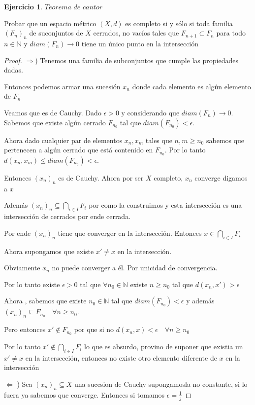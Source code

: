 \documentclass[11pt]{report}
\newcommand{\N}{\mathbb{N}}
\newcommand{\Ra}{\Rightarrow}
\newcommand{\ra}{\rightarrow}
\theoremstyle{definition}
\newtheorem{ej}{Ejercicio}
\begin{document}
	\begin{ej}
	$Teorema$ $de$ $cantor$

	Probar que un espacio métrico $(X,d)$ es completo si y sólo si toda familia $(F_n)_n$ de suconjuntos de $X$ cerrados, no vacíos tales que $F_{n+1} \subset F_n$ para todo $n \in \N$ y $diam(F_n) \ra 0$ tiene un único punto en la intersección

		\begin{proof}
			$\Ra$) Tenemos una familia de subconjuntos que cumple las propiedades dadas.

			Entonces podemos armar una sucesión $x_n$ donde cada elemento es algún elemento de $F_n$

			Veamos que es de Cauchy. Dado $\epsilon >0$ y considerando que $diam(F_n) \ra 0$. Sabemos que existe algún cerrado $F_{n_0}$ tal que $diam(F_{n_0}) < \epsilon$.

			Ahora dado cualquier par de elementos $x_n, x_m$ tales que $n,m \geq n_0$ sabemos que pertenecen a algún cerrado que está contenido en $F_{n_0}$. Por lo tanto $d(x_n,x_m) \leq diam(F_{n_0}) < \epsilon$.

			Entonces $(x_n)_n$ es de Cauchy. Ahora por ser $X$ completo, $x_n$ converge digamos a $x$

			Además $(x_n)_n \subseteq \bigcap_{i \in I} F_i$ por como la construimos y esta intersección es una intersección de cerrados por ende cerrada.

			Por ende $(x_n)_n$ tiene que converger en la intersección. Entonces $x \in \bigcap_{i \in I}F_i$

			Ahora supongamos que existe $x'\neq x$ en la intersección. 

			Obviamente $x_n$ no puede converger a él. Por unicidad de convergencia. 

			Por lo tanto existe $\epsilon > 0$ tal que $\forall n_0\in \N$ existe $n \geq n_0$ tal que $d(x_n,x') > \epsilon$

			Ahora , sabemos que existe $n_0 \in \N$ tal que $diam(F_{n_0}) < \epsilon$ y además  $(x_n)_n \subseteq F_{n_0} \quad \forall n \geq n_0$.

			Pero entonces $x' \notin F_{n_0}$ por que si no $d(x_n,x) < \epsilon \quad \forall n\geq n_0$

			Por lo tanto $x' \notin \bigcap_{i \in I} F_i$ lo que es absurdo, provino de suponer que existia un $x'\neq x$ en la intersección, entonces no existe otro elemento diferente de $x$ en la intersección

			$\Leftarrow$ ) Sea $(x_n)_n \subseteq X$ una sucesion de Cauchy supongamosla no constante, si lo fuera ya sabemos que converge. Entonces si tomamos $\epsilon = \frac{1}{j}$ 


\end{proof}
\end{ej}
\end{document}
